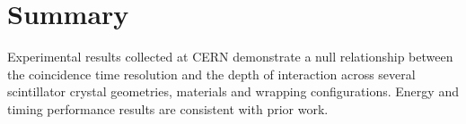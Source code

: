 \section{Summary}
Experimental results collected at CERN demonstrate a null relationship between the coincidence time resolution and the depth of interaction across several scintillator crystal geometries, materials and wrapping configurations. Energy and timing performance results are consistent with prior work.